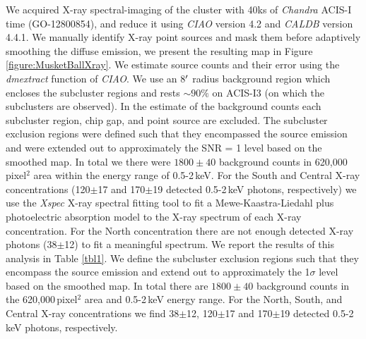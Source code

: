 We acquired X-ray spectral-imaging of the cluster with 40ks of {\it Chandra} ACIS-I time (GO-12800854), and reduce it using \emph{CIAO} version 4.2 and \emph{CALDB} version 4.4.1.
We manually identify X-ray point sources and mask them before adaptively smoothing the diffuse emission, we present the resulting map in Figure \ref{figure:MusketBallXray}.
We estimate source counts and their error using the \emph{dmextract} function of \emph{CIAO}.
We use an 8$\mbox{$^\prime$}$ radius background region which encloses the subcluster regions and rests $\sim90\%$ on ACIS-I3 (on which the subclusters are observed).
In the estimate of the background counts each subcluster region, chip gap, and point source are excluded.
The subcluster exclusion regions were defined such that they encompassed the source emission and were extended out to approximately the SNR = 1 level based on the smoothed map.
In total we there were $1800\pm40$ background counts in 620,000 pixel$^2$ area within the energy range of 0.5-2\,keV.
For the South and Central X-ray concentrations (120$\pm$17 and 170$\pm$19 detected 0.5-2\,keV photons, respectively) we use the \emph{Xspec} X-ray spectral fitting tool \citep{Arnaud:1996vl} to fit a Mewe-Kaastra-Liedahl plus photoelectric absorption model \citep[fixed to the Leiden/Argentine/Bonn value;][]{Kalberla:2005de} to the X-ray spectrum of each X-ray concentration.
For the North concentration there are not enough detected X-ray photons (38$\pm$12) to fit a meaningful spectrum.  
We report the results of this analysis in Table \ref{tbl1}. 
We define the subcluster exclusion regions such that they encompass the source emission and extend out to approximately the 1$\sigma$ level based on the smoothed map.  
In total there are $1800\pm40$ background counts in the 620,000\,pixel$^2$ area and 0.5-2\,keV energy range.
For the North, South, and Central X-ray concentrations we find 38$\pm$12, 120$\pm$17 and 170$\pm$19 detected 0.5-2\,keV photons, respectively.   
 
